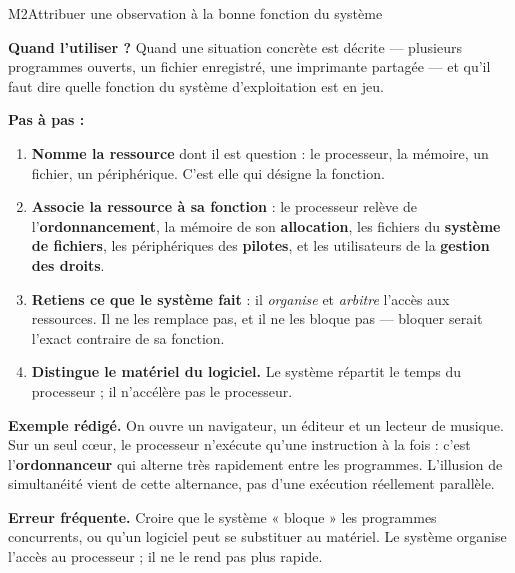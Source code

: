 \begin{fichemethode}{M2}{Attribuer une observation à la bonne fonction du système}

\textbf{Quand l'utiliser ?} Quand une situation concrète est décrite — plusieurs programmes
ouverts, un fichier enregistré, une imprimante partagée — et qu'il faut dire quelle fonction du
système d'exploitation est en jeu.

\textbf{Pas à pas :}
\begin{enumerate}
  \item \textbf{Nomme la ressource} dont il est question : le processeur, la mémoire, un
        fichier, un périphérique. C'est elle qui désigne la fonction.
  \item \textbf{Associe la ressource à sa fonction} : le processeur relève de
        l'\textbf{ordonnancement}, la mémoire de son \textbf{allocation}, les fichiers du
        \textbf{système de fichiers}, les périphériques des \textbf{pilotes}, et les
        utilisateurs de la \textbf{gestion des droits}.
  \item \textbf{Retiens ce que le système fait} : il \emph{organise} et \emph{arbitre} l'accès
        aux ressources. Il ne les remplace pas, et il ne les bloque pas — bloquer serait
        l'exact contraire de sa fonction.
  \item \textbf{Distingue le matériel du logiciel.} Le système répartit le temps du processeur ;
        il n'accélère pas le processeur.
\end{enumerate}

\textbf{Exemple rédigé.} On ouvre un navigateur, un éditeur et un lecteur de musique. Sur un
seul cœur, le processeur n'exécute qu'une instruction à la fois : c'est l'\textbf{ordonnanceur}
qui alterne très rapidement entre les programmes. L'illusion de simultanéité vient de cette
alternance, pas d'une exécution réellement parallèle.

\textbf{Erreur fréquente.} Croire que le système « bloque » les programmes concurrents, ou
qu'un logiciel peut se substituer au matériel. Le système organise l'accès au processeur ; il
ne le rend pas plus rapide.

\end{fichemethode}

